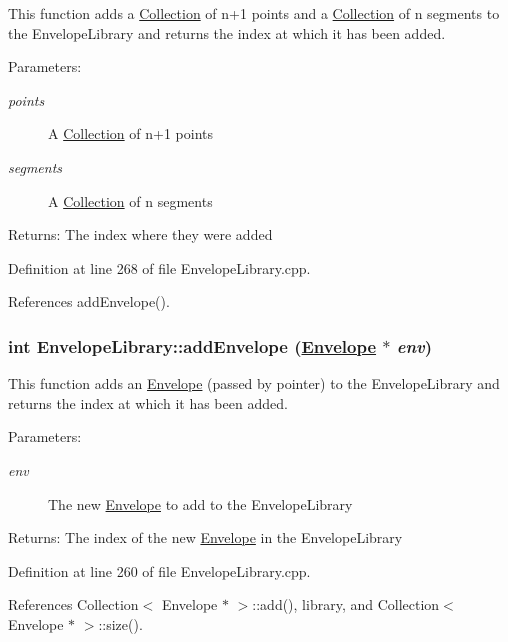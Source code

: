 This function adds a \hyperlink{classCollection}{Collection} of n+1 points and a \hyperlink{classCollection}{Collection} of n segments to the Envelope\-Library and returns the index at which it has been added. \begin{Desc}
\item[Parameters:]
\begin{description}
\item[{\em points}]A \hyperlink{classCollection}{Collection} of n+1 points \item[{\em segments}]A \hyperlink{classCollection}{Collection} of n segments \end{description}
\end{Desc}
\begin{Desc}
\item[Returns:]The index where they were added \end{Desc}


Definition at line 268 of file Envelope\-Library.cpp.

References add\-Envelope().\hypertarget{classEnvelopeLibrary_a7}{
\subsubsection[addEnvelope]{\setlength{\rightskip}{0pt plus 5cm}int Envelope\-Library::add\-Envelope (\hyperlink{classEnvelope}{Envelope} $\ast$ {\em env})}}
\label{classEnvelopeLibrary_a7}


This function adds an \hyperlink{classEnvelope}{Envelope} (passed by pointer) to the Envelope\-Library and returns the index at which it has been added. \begin{Desc}
\item[Parameters:]
\begin{description}
\item[{\em env}]The new \hyperlink{classEnvelope}{Envelope} to add to the Envelope\-Library \end{description}
\end{Desc}
\begin{Desc}
\item[Returns:]The index of the new \hyperlink{classEnvelope}{Envelope} in the Envelope\-Library \end{Desc}


Definition at line 260 of file Envelope\-Library.cpp.

References Collection$<$ Envelope $\ast$ $>$::add(), library, and Collection$<$ Envelope $\ast$ $>$::size().

